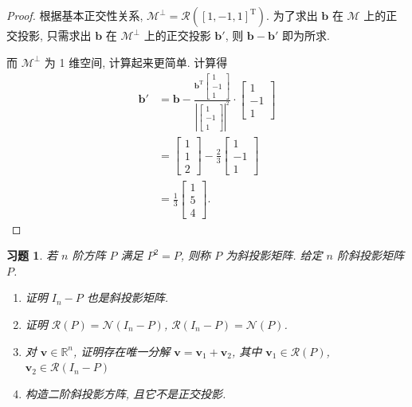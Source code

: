 \documentclass[UTF8]{ctexart}
\newtheorem{ex}[thm]{习题}
\begin{document}
\begin{proof}
  根据基本正交性关系, \(\mathcal{M}^{\perp} = \mathcal{R}([1,-1,1]^{\mathrm{T}})\).
  为了求出 \(\boldsymbol{b}\) 在 \(\mathcal{M}\)
  上的正交投影, 只需求出 \(\boldsymbol{b}\) 在 \(\mathcal{M}^{\perp}\)
  上的正交投影 \(\boldsymbol{b}'\), 则 \(\boldsymbol{b} - \boldsymbol{b}'\)
  即为所求.

  而 \(\mathcal{M}^{\perp}\) 为 1 维空间, 计算起来更简单.
  计算得
  \begin{align*}
    \boldsymbol{b}'
    &= \boldsymbol{b} - \frac{\boldsymbol{b}^{\mathrm{T}}\left[ \begin{smallmatrix} 1 \\ -1 \\ 1 \end{smallmatrix}\right]}{\left| \left[\begin{smallmatrix} 1 \\ -1 \\ 1 \end{smallmatrix} \right]\right|^2} \cdot \left[  \begin{smallmatrix} 1 \\ -1 \\ 1 \end{smallmatrix} \right] \\
    &= \left[  \begin{smallmatrix} 1 \\ 1 \\ 2 \end{smallmatrix} \right] -
      \frac{2}{3}\left[  \begin{smallmatrix} 1 \\ -1 \\ 1 \end{smallmatrix} \right] \\
    &= \frac{1}{3}\left[  \begin{smallmatrix} 1 \\ 5 \\ 4 \end{smallmatrix} \right].
  \end{align*}
\end{proof}


\begin{ex}
  若 \(n\) 阶方阵 \(P\) 满足 \(P^{2} = P\), 则称 \(P\) 为斜投影矩阵.
  给定 \(n\) 阶斜投影矩阵 \(P\).
  \begin{enumerate}
  \item 证明 \(I_{n} - P\) 也是斜投影矩阵.
  \item 证明 \(\mathcal{R}(P) = \mathcal{N}(I_{n} - P)\), \(\mathcal{R}(I_{n}-P) = \mathcal{N}(P)\).
  \item 对 \(\boldsymbol{v} \in \mathbb{R}^{n}\), 证明存在唯一分解 \(\boldsymbol{v} = \boldsymbol{v}_1 + \boldsymbol{v}_{2}\),
    其中 \(\boldsymbol{v}_{1} \in \mathcal{R}(P)\), \(\boldsymbol{v}_{2} \in \mathcal{R}(I_{n} - P)\)
  \item 构造二阶斜投影方阵, 且它不是正交投影.
  \end{enumerate}
\end{ex}
\end{document}
